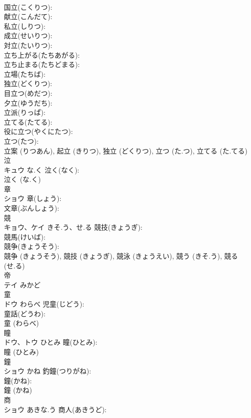 \documentclass[8pt]{extreport}
\begin{document}
\begin{CJK}{UTF8}{min}
\\	国立(こくりつ): 
\\	献立(こんだて): 
\\	私立(しりつ): 
\\	成立(せいりつ): 
\\	対立(たいりつ): 
\\	立ち上がる(たちあがる): 
\\	立ち止まる(たちどまる): 
\\	立場(たちば): 
\\	独立(どくりつ): 
\\	目立つ(めだつ): 
\\	夕立(ゆうだち): 
\\	立派(りっぱ): 
\\	立てる(たてる): 
\\	役に立つ(やくにたつ): 
\\	立つ(たつ): 
\\	立案 (りつあん), 起立 (きりつ), 独立 (どくりつ), 立つ (た.つ), 立てる (た.てる)
\\	泣			
\\	キュウ	な.く	泣く(なく): 
\\	泣く (な.く)
\\	章			
\\	ショウ		章(しょう): 
\\	文章(ぶんしょう): 
\\	競			
\\	キョウ、ケイ	きそ.う、せ.る	競技(きょうぎ): 
\\	競馬(けいば): 
\\	競争(きょうそう): 
\\	競争 (きょうそう), 競技 (きょうぎ), 競泳 (きょうえい), 競う (きそ.う), 競る (せ.る)
\\	帝			
\\	テイ	みかど		
\\	童			
\\	ドウ	わらべ	児童(じどう): 
\\	童話(どうわ): 
\\	童 (わらべ)
\\	瞳		
\\	ドウ、トウ	ひとみ	瞳(ひとみ): 
\\	瞳 (ひとみ)
\\	鐘		
\\	ショウ	かね	釣鐘(つりがね): 
\\	鐘(かね): 
\\	鐘 (かね)
\\	商			
\\	ショウ	あきな.う	商人(あきうど): 

\end{CJK}
\end{document}
